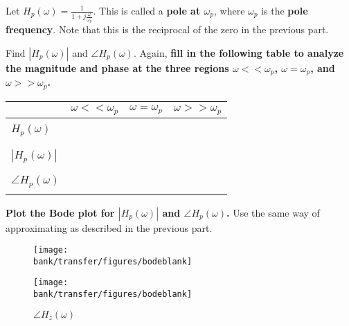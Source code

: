 \begin{enumerate}
\sol{
}

\qitem Let $H_p(\omega) = \frac{1}{1 + j \frac{\omega}{\omega_p}}$. This is called a \textbf{pole at $\omega_p$}, where $\omega_p$ is the \textbf{pole frequency}. Note that this is the reciprocal of the zero in the previous part.
\begin{enumerate}
    \qitem Find $|H_p(\omega)|$ and $\angle H_p(\omega)$.
    \qitem Again, \textbf{fill in the following table to analyze the magnitude and phase at the three regions $\omega << \omega_p$, $\omega = \omega_p$, and $\omega >> \omega_p$.}

    \begin{table}[ht!]
      \centering
      \begin{tabular}{| l | >{\centering\arraybackslash}m{6em} | >{\centering\arraybackslash}m{6em} | >{\centering\arraybackslash}m{6em} |} 
      \cline{2-4}
      \multicolumn{1}{l|}{}& $\omega << \omega_p$ & $\omega = \omega_p$ & $\omega >> \omega_p$ \\
      \hline
      &&&\\
      $H_p(\omega)$        &                      &                     &                      \\
      &&&\\
      \hline
      &&&\\
      $|H_p(\omega)|$      &                      &                     &                      \\
      &&&\\
      \hline
      &&&\\
      $\angle H_p(\omega)$ &                      &                     &                      \\
      &&&\\
      \hline
      \end{tabular}
    \end{table}

    \qitem \textbf{Plot the Bode plot for $|H_p(\omega)|$ and $\angle H_p(\omega)$.}
           Use the same way of approximating as described in the previous part.
\end{enumerate}

\begin{figure}[!ht]
  \centering
  \begin{minipage}[b]{0.45\textwidth}
  \texttt{[image: \\bank/transfer/figures/bodeblank]}
    \caption*{$|H_z(\omega)|$}
  \end{minipage}
  \hfill
  \begin{minipage}[b]{0.45\textwidth}
  \texttt{[image: \\bank/transfer/figures/bodeblank]}
    \caption*{$\angle H_z(\omega)$}
  \end{minipage}
\end{figure}


\end{enumerate}
